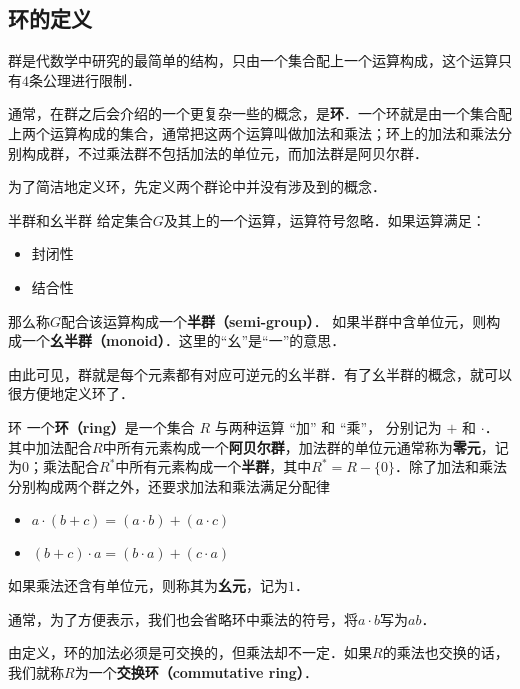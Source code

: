 


\subsection{环的定义}
群是代数学中研究的最简单的结构，只由一个集合配上一个运算构成，这个运算只有$4$条公理进行限制．

通常，在群之后会介绍的一个更复杂一些的概念，是\textbf{环}．一个环就是由一个集合配上两个运算构成的集合，通常把这两个运算叫做加法和乘法；环上的加法和乘法分别构成群，不过乘法群不包括加法的单位元，而加法群是阿贝尔群．

为了简洁地定义环，先定义两个群论中并没有涉及到的概念．

\begin{definition}{半群和幺半群}
给定集合$G$及其上的一个运算，运算符号忽略．如果运算满足：
\begin{itemize}
\item 封闭性
\item 结合性
\end{itemize}
那么称$G$配合该运算构成一个\textbf{半群（semi-group）}．
如果半群中含单位元，则构成一个\textbf{幺半群（monoid）}．这里的“幺”是“一”的意思．
\end{definition}

由此可见，群就是每个元素都有对应可逆元的幺半群．有了幺半群的概念，就可以很方便地定义环了．

\begin{definition}{环}
一个\textbf{环（ring）}是一个集合 $R$ 与两种运算 “加” 和 “乘”， 分别记为 $+$ 和 $\cdot$． 其中加法配合$R$中所有元素构成一个\textbf{阿贝尔群}，加法群的单位元通常称为\textbf{零元}，记为$0$；乘法配合$R^*$中所有元素构成一个\textbf{半群}，其中$R^*=R-\{0\}$．除了加法和乘法分别构成两个群之外，还要求加法和乘法满足分配律
\begin{itemize}
\item $a \cdot (b + c) = (a \cdot b) + (a \cdot c)$
\item $(b + c) \cdot a = (b \cdot a) + (c \cdot a)$
\end{itemize}
如果乘法还含有单位元，则称其为\textbf{幺元}，记为$1$．
\end{definition}

通常，为了方便表示，我们也会省略环中乘法的符号，将$a\cdot b$写为$ab$．

由定义，环的加法必须是可交换的，但乘法却不一定．如果$R$的乘法也交换的话，我们就称$R$为一个\textbf{交换环（commutative ring）}．

